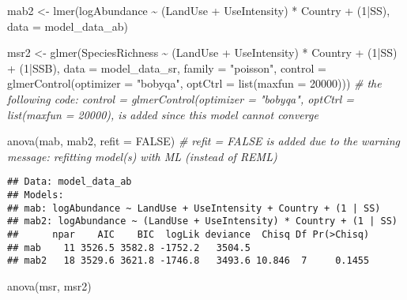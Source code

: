 \documentclass[
]{article}
\newenvironment{Shaded}{\begin{snugshade}}{\end{snugshade}}
\newcommand{\AttributeTok}[1]{\textcolor[rgb]{0.77,0.63,0.00}{#1}}
\newcommand{\CommentTok}[1]{\textcolor[rgb]{0.56,0.35,0.01}{\textit{#1}}}
\newcommand{\ConstantTok}[1]{\textcolor[rgb]{0.00,0.00,0.00}{#1}}
\newcommand{\DecValTok}[1]{\textcolor[rgb]{0.00,0.00,0.81}{#1}}
\newcommand{\FunctionTok}[1]{\textcolor[rgb]{0.00,0.00,0.00}{#1}}
\newcommand{\NormalTok}[1]{#1}
\newcommand{\OtherTok}[1]{\textcolor[rgb]{0.56,0.35,0.01}{#1}}
\newcommand{\SpecialCharTok}[1]{\textcolor[rgb]{0.00,0.00,0.00}{#1}}
\newcommand{\StringTok}[1]{\textcolor[rgb]{0.31,0.60,0.02}{#1}}
\begin{document}
\begin{Shaded}
\begin{Highlighting}[]
\NormalTok{mab2 }\OtherTok{\textless{}{-}} \FunctionTok{lmer}\NormalTok{(logAbundance }\SpecialCharTok{\textasciitilde{}}\NormalTok{ (LandUse }\SpecialCharTok{+}\NormalTok{ UseIntensity) }\SpecialCharTok{*}\NormalTok{ Country }\SpecialCharTok{+}\NormalTok{ (}\DecValTok{1}\SpecialCharTok{|}\NormalTok{SS), }\AttributeTok{data =}\NormalTok{ model\_data\_ab)}

\NormalTok{msr2 }\OtherTok{\textless{}{-}} \FunctionTok{glmer}\NormalTok{(SpeciesRichness }\SpecialCharTok{\textasciitilde{}}\NormalTok{ (LandUse }\SpecialCharTok{+}\NormalTok{ UseIntensity) }\SpecialCharTok{*}\NormalTok{ Country }\SpecialCharTok{+}\NormalTok{ (}\DecValTok{1}\SpecialCharTok{|}\NormalTok{SS) }\SpecialCharTok{+}\NormalTok{ (}\DecValTok{1}\SpecialCharTok{|}\NormalTok{SSB), }\AttributeTok{data =}\NormalTok{ model\_data\_sr, }\AttributeTok{family =} \StringTok{"poisson"}\NormalTok{, }\AttributeTok{control =} \FunctionTok{glmerControl}\NormalTok{(}\AttributeTok{optimizer =} \StringTok{"bobyqa"}\NormalTok{, }\AttributeTok{optCtrl =} \FunctionTok{list}\NormalTok{(}\AttributeTok{maxfun =} \DecValTok{20000}\NormalTok{))) }\CommentTok{\# the following code: control = glmerControl(optimizer = "bobyqa", optCtrl = list(maxfun = 20000), is added since this model cannot converge}


\FunctionTok{anova}\NormalTok{(mab, mab2, }\AttributeTok{refit =} \ConstantTok{FALSE}\NormalTok{) }\CommentTok{\# refit = FALSE is added due to the warning message: refitting model(s) with ML (instead of REML)}
\end{Highlighting}
\end{Shaded}

\begin{verbatim}
## Data: model_data_ab
## Models:
## mab: logAbundance ~ LandUse + UseIntensity + Country + (1 | SS)
## mab2: logAbundance ~ (LandUse + UseIntensity) * Country + (1 | SS)
##      npar    AIC    BIC  logLik deviance  Chisq Df Pr(>Chisq)
## mab    11 3526.5 3582.8 -1752.2   3504.5                     
## mab2   18 3529.6 3621.8 -1746.8   3493.6 10.846  7     0.1455
\end{verbatim}

\begin{Shaded}
\begin{Highlighting}[]
\FunctionTok{anova}\NormalTok{(msr, msr2)}
\end{Highlighting}
\end{Shaded}
\end{document}
